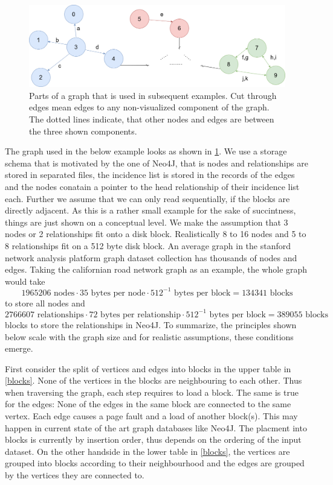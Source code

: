   \begin{figure}[htp]
    \begin{center}
        \includegraphics[keepaspectratio,height=0.3\textheight,width=\textwidth]{img/04-problem_def/example_graph.png}
    \end{center}
    \caption{Parts of a graph that is used in subsequent examples. Cut through edges mean edges to any non-visualized component of the graph. The dotted lines indicate, that other nodes and edges are between the three shown components.}
    \label{ex-gr}
  \end{figure}
  
  The graph used in the below example looks as shown in \ref{ex-gr}.
  We use a storage schema that is motivated by the one of Neo4J, that is nodes and relationships are stored in separated files, the incidence list is stored in the records of the edges and the nodes conatain a pointer to the head relationship of their incidence list each. Further we assume that we can only read sequentially, if the blocks are directly adjacent.
  As this is a rather small example for the sake of succintness, things are just shown on a conceptual level. 
  We make the assumption that 3 nodes or 2 relationships fit onto a disk block. 
  Realistically 8 to 16 nodes and 5 to 8 relationships fit on a 512 byte disk block. 
  An average graph in the stanford network analysis platform graph dataset collection has thousands of nodes and edges. 
  Taking the californian road network graph as an example, the whole graph would take 
  \[ 1 965 206 \text{ nodes} \cdot 35 \text{ bytes per node} \cdot 512^{-1} \text{ bytes per block} = 134 341\text{ blocks}\] 
  to store all nodes and 
  \[2 766 607 \text{ relationships} \cdot 72 \text{ bytes per relationship} \cdot 512^{-1} \text{ bytes per block} = 389055\text{ blocks}\] 
  blocks to store the relationships in Neo4J.
  To summarize, the principles shown below scale with the graph size and for realistic assumptions, these conditions emerge.

  First consider the split of vertices and edges into blocks in the upper table in \ref{blocks}. 
  None of the vertices in the blocks are neighbouring to each other.
  Thus when traversing the graph, each step requires to load a block.
  The same is true for the edges: 
  None of the edges in the same block are connected to the same vertex. 
  Each edge causes a page fault and a load of another block(s).
  This may happen in current state of the art graph databases like Neo4J. 
  The placment into blocks is currently by insertion order, thus depends on the ordering of the input dataset. 
  On the other handside in the lower table in \ref{blocks}, the vertices are grouped into blocks according to their neighbourhood and the edges are grouped by the vertices they are connected to.

